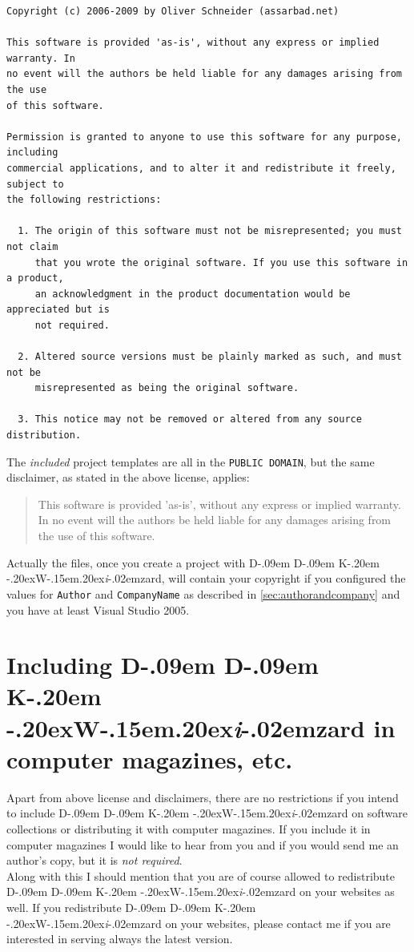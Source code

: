 \documentclass[a4paper,titlepage]{report}
\def\ddkwiz{D\kern-.09em D\kern-.09em K\kern-.20em \raise-.20ex\hbox{W}\kern-.15em\raise.20ex\hbox{\it{i}}\kern-.02em{zard}}
\begin{document}
\begin{verbatim}
Copyright (c) 2006-2009 by Oliver Schneider (assarbad.net)

This software is provided 'as-is', without any express or implied warranty. In
no event will the authors be held liable for any damages arising from the use
of this software.

Permission is granted to anyone to use this software for any purpose, including
commercial applications, and to alter it and redistribute it freely, subject to
the following restrictions:

  1. The origin of this software must not be misrepresented; you must not claim
     that you wrote the original software. If you use this software in a product,
     an acknowledgment in the product documentation would be appreciated but is
     not required.

  2. Altered source versions must be plainly marked as such, and must not be
     misrepresented as being the original software.

  3. This notice may not be removed or altered from any source distribution.
\end{verbatim}

The \emph{included} project templates are all in the \texttt{PUBLIC DOMAIN}, but the same
disclaimer, as stated in the above license, applies:

\begin{quote}
This software is provided 'as-is', without any express or implied warranty. In
no event will the authors be held liable for any damages arising from the use
of this software.
\end{quote}

Actually the files, once you create a project with \ddkwiz{}, will contain your
copyright if you configured the values for \texttt{Author} and \texttt{CompanyName}
as described in \autoref{sec:authorandcompany} and you have at least Visual
Studio 2005.

\section*{Including \ddkwiz{} in computer magazines, etc.}
Apart from above license and disclaimers, there are no restrictions if you intend
to include \ddkwiz{} on software collections or distributing it with computer
magazines. If you include it in computer magazines I would like to hear from
you and if you would send me an author's copy, but it is \emph{not required}.\\
Along with this I should mention that you are of course allowed to redistribute
\ddkwiz{} on your websites as well. If you redistribute \ddkwiz{} on your
websites, please contact me if you are interested in serving always the latest
version.
\end{document}
